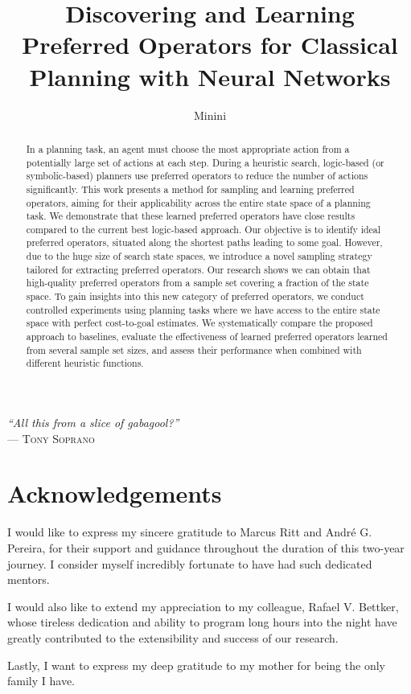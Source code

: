 \documentclass[ppgc,diss,english]{iiufrgs}
\title{Discovering and Learning Preferred Operators for Classical Planning with Neural Networks}
\author{Minini}{Pedro Probst}
\begin{document}
\maketitle

\clearpage
\begin{flushright}
\mbox{}\vfill
{\sffamily\itshape
    ``All this from a slice of gabagool?''\\}
--- \textsc{Tony Soprano}
\end{flushright}

\chapter*{Acknowledgements}

I would like to express my sincere gratitude to Marcus Ritt and André G. Pereira, for their support and guidance throughout the duration of this two-year journey. I consider myself incredibly fortunate to have had such dedicated mentors.

I would also like to extend my appreciation to my colleague, Rafael V. Bettker, whose tireless dedication and ability to program long hours into the night have greatly contributed to the extensibility and success of our research.

Lastly, I want to express my deep gratitude to my mother for being the only family I have.

\begin{abstract}
In a planning task, an agent must choose the most appropriate action from a potentially large set of actions at each step. During a heuristic search, logic-based (or symbolic-based) planners use preferred operators to reduce the number of actions significantly. This work presents a method for sampling and learning preferred operators, aiming for their applicability across the entire state space of a planning task. We demonstrate that these learned preferred operators have close results compared to the current best logic-based approach.
Our objective is to identify ideal preferred operators, situated along the shortest paths leading to some goal. However, due to the huge size of search state spaces, we introduce a novel sampling strategy tailored for extracting preferred operators. Our research shows we can obtain that high-quality preferred operators from a sample set covering a fraction of the state space.
To gain insights into this new category of preferred operators, we conduct controlled experiments using planning tasks where we have access to the entire state space with perfect cost-to-goal estimates. We systematically compare the proposed approach to baselines, evaluate the effectiveness of learned preferred operators learned from several sample set sizes, and assess their performance when combined with different heuristic functions.
\end{abstract}
\end{document}
